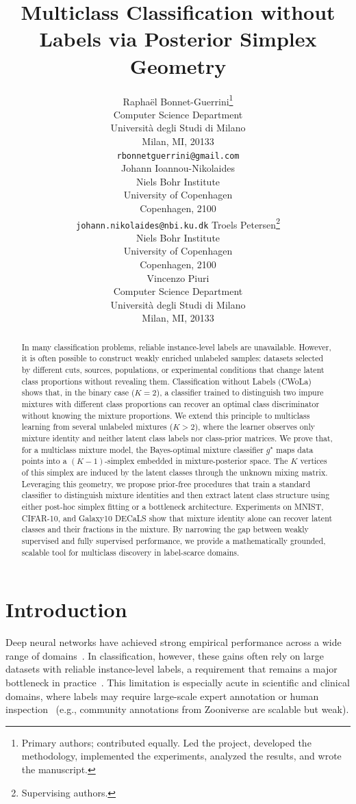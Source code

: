 \documentclass{article}
\title{Multiclass Classification without Labels via Posterior Simplex Geometry}
\author{%
  Rapha{\"e}l Bonnet-Guerrini\thanks{Primary authors; contributed equally. Led the project,
developed the methodology, implemented the experiments, analyzed the results,
and wrote the manuscript.} \\
  Computer Science Department\\
  Universit\`a degli Studi di Milano\\
  Milan, MI, 20133 \\
  \texttt{rbonnetguerrini@gmail.com} \\
  \And
  Johann Ioannou-Nikolaides\footnotemark[1] \\
  Niels Bohr Institute \\
  University of Copenhagen \\
  Copenhagen, 2100 \\
  \texttt{johann.nikolaides@nbi.ku.dk}
  \And
  Troels Petersen\thanks{Supervising authors.} \\
  Niels Bohr Institute \\
  University of Copenhagen \\
  Copenhagen, 2100 \\ 
  \And
  Vincenzo Piuri\footnotemark[2] \\
  Computer Science Department\\
  Universit\`a degli Studi di Milano\\
  Milan, MI, 20133 \\
}
\theoremstyle{plain}
\theoremstyle{definition}
\theoremstyle{remark}
\begin{document}
\maketitle

\begin{abstract}In many classification problems, reliable instance-level labels are unavailable. However, it is often possible to construct weakly enriched unlabeled samples: datasets selected by different cuts, sources, populations, or experimental conditions that change latent class proportions without revealing them. Classification without Labels (CWoLa) shows that, in the binary case ($K=2$), a classifier trained to distinguish two impure mixtures with different class proportions can recover an optimal class discriminator without knowing the mixture proportions. We extend this principle to multiclass learning from several unlabeled mixtures ($K>2$), where the learner observes only mixture identity and neither latent class labels nor class-prior matrices. We prove that, for a multiclass mixture model, the Bayes-optimal mixture classifier $g^\star$ maps data points into a $(K-1)$-simplex embedded in mixture-posterior space. The $K$ vertices of this simplex are induced by the latent classes through the unknown mixing matrix. Leveraging this geometry, we propose prior-free procedures that train a standard classifier to distinguish mixture identities and then extract latent class structure using either post-hoc simplex fitting or a bottleneck architecture. Experiments on MNIST, CIFAR-10, and Galaxy10 DECaLS show that mixture identity alone can recover latent classes and their fractions in the mixture. By narrowing the gap between weakly supervised and fully supervised performance, we provide a mathematically grounded, scalable tool for multiclass discovery in label-scarce domains.
\end{abstract}


\section{Introduction}

Deep neural networks have achieved strong empirical performance across a wide range of domains~\citep{lecun:hal-04206682}. 
In classification, however, these gains often rely on large datasets with reliable instance-level labels, a requirement that remains a major bottleneck in practice~\citep{Russakovsky2014ImageNetLS,Ratner2017SnorkelRT}. 
This limitation is especially acute in scientific and clinical domains, where labels may require large-scale expert annotation or human inspection~\citep{Darg:2009rc,Wang2020AnnotationefficientDL}
(e.g., community annotations from Zooniverse are scalable but weak).
\end{document}

